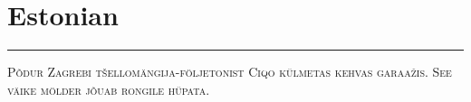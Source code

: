 \vspace{-1em}\section*{\checkno Estonian}
\vspace{-.5em}\hrule\vspace{.5em}
\noindent\textsc{Põdur Zagrebi tšellomängija-följetonist Ciqo külmetas kehvas garaažis.
See väike mölder jõuab rongile hüpata.}